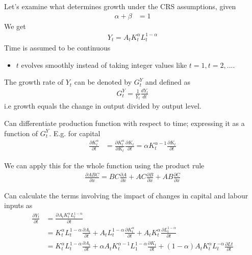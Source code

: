 \documentclass{beamer}
\begin{document}
\begin{frame}
  Let's examine what determines growth under the CRS assumptions, given   
  \begin{align}
   \alpha+\beta &= 1
  \end{align}
  We get
  \begin{align}
    Y_t=A_tK^{\alpha}_tL^{1-\alpha}_t
  \end{align}
  \medskip
  Time is assumed to be continuous
  \begin{itemize}
    \item $t$ evolves smoothly instead of taking integer values like $t=1,t=2,...$.
  \end{itemize}
  \medskip
  The growth rate of $Y_t$ can be denoted by $G^Y_t$ and defined as
  \begin{align}
    G^Y_t=\frac{1}{Y_t}\frac{dY_t}{dt}
  \end{align}
  i.e growth equals the change in output divided by output level.
\end{frame}

\begin{frame}
  Can differentiate production function with respect to time; expressing it as a function of $G^Y_t$.
  E.g. for capital 
  \begin{align}
    \frac{\partial K_t^{\alpha}}{\partial t} &= \frac{\partial K_t^{\alpha}}{\partial K_t}\frac{\partial K_t}{\partial t} =\alpha K_t^{\alpha-1}\frac{\partial K_t}{\partial t}
  \end{align}
\end{frame}

\begin{frame}
  We can apply this for the whole function using the product rule
  \begin{align}
  \frac{\partial ABC}{\partial x}=BC\frac{\partial A}{\partial x}+AC\frac{\partial B}{\partial x}+AB\frac{\partial C}{\partial x}
\end{align}
\end{frame}

\begin{frame}
 Can calculate the terms involving the impact of changes in capital and labour inputs as
  \begin{align}
    \frac{\partial Y_t}{\partial t} &= \frac{\partial A_tK_t^{\alpha}L_t^{1-\alpha}}{\partial t}\\ \nonumber
    &= K_t^{\alpha}L_t^{1-\alpha}\frac{\partial A_t}{\partial t} + A_tL_t^{1-\alpha}\frac{\partial K_t^{\alpha}}{\partial t} + A_tK_t^{\alpha}\frac{\partial L_t^{1-\alpha}}{\partial t}\\ \nonumber
    &= K_t^{\alpha}L_t^{1-\alpha}\frac{\partial A_t}{\partial t} + \alpha A_tK_t^{\alpha-1}L_1^{1-\alpha} \frac{\partial K_t}{\partial t}  + (1-\alpha)A_tK_t^{\alpha}L_t^{-\alpha}\frac{\partial Lt}{\partial t}
  \end{align}
\end{frame}
\end{document}
